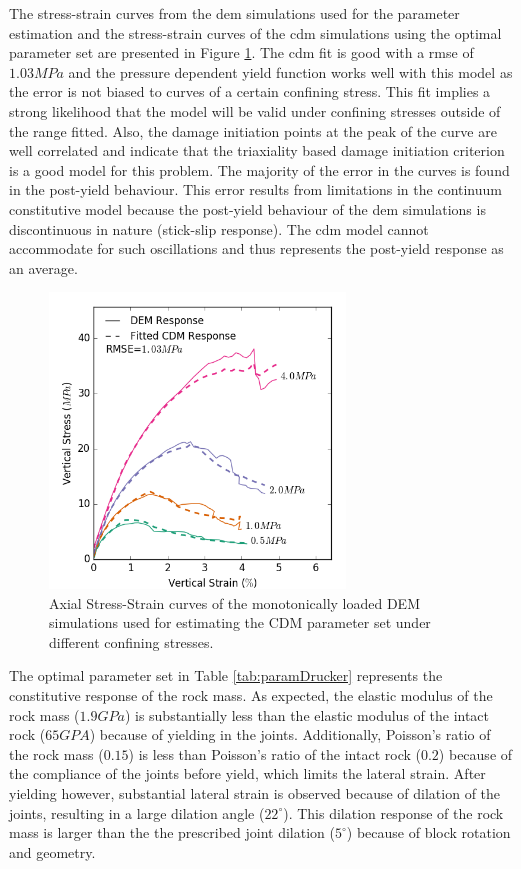 The stress-strain curves from the \acrshort{dem} simulations used for the parameter estimation and the stress-strain curves of the \acrshort{cdm} simulations using the optimal parameter set are presented in Figure \ref{fig:fitted1}. The \acrshort{cdm} fit is good with a \acrfull{rmse} of $1.03MPa$ and the pressure dependent yield function works well with this model as the error is not biased to curves of a certain confining stress. This fit implies a strong likelihood that the model will be valid under confining stresses outside of the range fitted. Also, the damage initiation points at the peak of the curve are well correlated and indicate that the triaxiality based damage initiation criterion is a good model for this problem. The majority of the error in the curves is found in the post-yield behaviour. This error results from limitations in the continuum constitutive model because the post-yield behaviour of the \acrshort{dem} simulations is discontinuous in nature (stick-slip response). The \acrshort{cdm} model cannot accommodate for such oscillations and thus represents the post-yield response as an average. 

\begin{figure}[!htb]
\begin{center}
\includegraphics[width=0.7\textwidth]{figures/Chapter5/DruckerFittedCurves}
\caption{{\label{fig:fitted1} Axial Stress-Strain curves of the monotonically loaded DEM simulations used for estimating the CDM parameter set under different confining stresses.%
}}
\end{center}
\end{figure}

The optimal parameter set in Table \ref{tab:paramDrucker} represents the constitutive response of the rock mass. As expected, the elastic modulus of the rock mass ($1.9 GPa$) is substantially less than the elastic modulus of the intact rock ($65 GPA$) because of yielding in the joints. Additionally, Poisson's ratio of the rock mass ($0.15$) is less than Poisson's ratio of the intact rock ($0.2$) because of the compliance of the joints before yield, which limits the lateral strain. After yielding however, substantial lateral strain is observed because of dilation of the joints, resulting in a large dilation angle ($22^\circ$). This dilation response of the rock mass is larger than the the prescribed joint dilation ($5^\circ$) because of block rotation and geometry.

